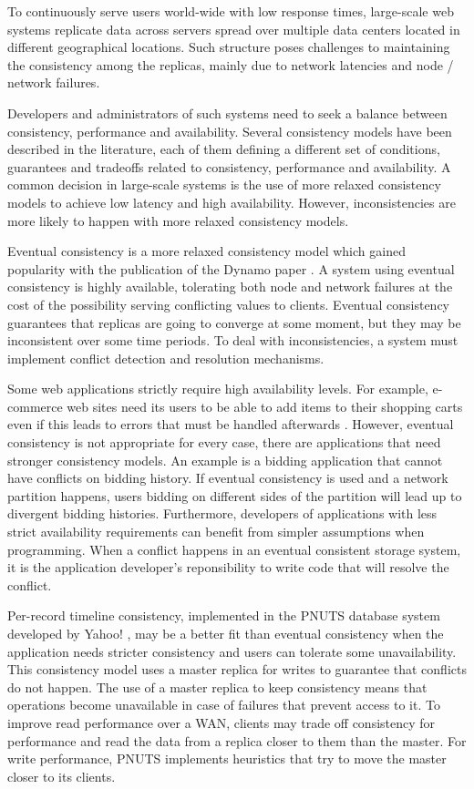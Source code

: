 \documentclass[doublespacing]{bmcart}
\begin{document}
To continuously serve users world-wide with low response times, large-scale web
systems replicate data across servers spread over multiple data centers located
in different geographical locations. Such structure poses challenges to
maintaining the consistency among the replicas, mainly due to network latencies
and node / network failures.

Developers and administrators of such systems need to seek a balance between
consistency, performance and availability. Several consistency models have been
described in the literature, each of them defining a different set of
conditions, guarantees and tradeoffs related to consistency, performance and
availability. A common decision in large-scale systems is the use of more
relaxed consistency models to achieve low latency and high availability.
However, inconsistencies are more likely to happen with more relaxed
consistency models.

Eventual consistency is a more relaxed consistency model which gained
popularity with the publication of the Dynamo paper \cite{DeCandia2007}.  A
system using eventual consistency is highly available, tolerating both node and
network failures at the cost of the possibility serving conflicting values to
clients. Eventual consistency guarantees that replicas are going to converge at
some moment, but they may be inconsistent over some time periods. To deal with
inconsistencies, a system must implement conflict detection and resolution
mechanisms.

Some web applications strictly require high availability levels. For example,
e-commerce web sites need its users to be able to add items to their shopping
carts even if this leads to errors that must be handled afterwards
\cite{DeCandia2007}. However, eventual consistency is not appropriate for every
case, there are applications that need stronger consistency models. An example
is a bidding application that cannot have conflicts on bidding history. If
eventual consistency is used and a network partition happens, users bidding on
different sides of the partition will lead up to divergent bidding histories.
Furthermore, developers of applications with less strict availability
requirements can benefit from simpler assumptions when programming. When a
conflict happens in an eventual consistent storage system, it is the
application developer's reponsibility to write code that will resolve the
conflict.

Per-record timeline consistency, implemented in the PNUTS database system
developed by Yahoo! \cite{Cooper2008}, may be a better fit than eventual
consistency when the application needs stricter consistency and users can
tolerate some unavailability. This consistency model uses a master replica for
writes to guarantee that conflicts do not happen. The use of a master replica
to keep consistency means that operations become unavailable in case of
failures that prevent access to it. To improve read performance over a WAN,
clients may trade off consistency for performance and read the data from a
replica closer to them than the master. For write performance, PNUTS implements
heuristics that try to move the master closer to its clients.
\end{document}
